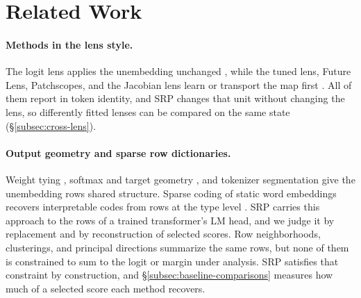 \section{Related Work}

\paragraph{Methods in the lens style.}
The logit lens applies the unembedding unchanged
\citep{nostalgebraist2020}, while the tuned lens, Future Lens,
Patchscopes, and the Jacobian lens learn or transport the map first
\citep{belrose2023tuned,pal2023future,ghandeharioun2024patchscopes,gurnee2026workspace}.
All of them report in token identity, and SRP changes that unit
without changing the lens, so differently fitted lenses can be
compared on the same state (\S\ref{subsec:cross-lens}).

\paragraph{Output geometry and sparse row dictionaries.}
Weight tying
\citep{press2017outputembedding,inan2017tying,lopardo2026weighttying},
softmax and target geometry
\citep{yang2018softmaxbottleneck,zhao2024implicit}, and tokenizer
segmentation \citep{bostrom2020bpe} give the unembedding rows shared
structure. Sparse
coding of static word embeddings recovers interpretable codes
from rows at the type level
\citep{murphy2012nnse,faruqui2015sparse,subramanian2018spine,arora2018polysemy}.
SRP carries this approach to the rows of a trained transformer's LM
head, and we judge it by replacement and by reconstruction of selected scores.
Row neighborhoods, clusterings, and principal directions summarize the
same rows, but none of them is constrained to sum to the logit or
margin under analysis. SRP satisfies that constraint by construction, and
\S\ref{subsec:baseline-comparisons} measures how much of a selected
score each method recovers.

